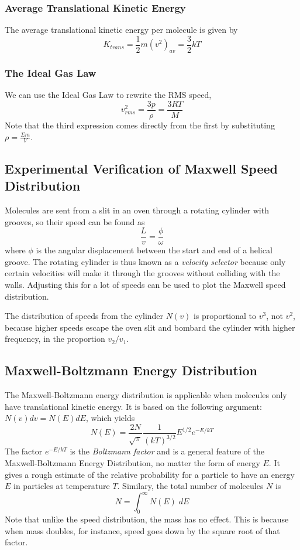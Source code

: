 \documentclass[../PhysicsFormulae.tex]{subfiles}
\begin{document}
\subsubsection{Average Translational Kinetic Energy}
The average translational kinetic energy per molecule is given by 
\[ {K}_{trans} = \frac{1}{2}m(v^2)_{av} = \frac{3}{2}kT \]

\subsubsection{The Ideal Gas Law}
We can use the Ideal Gas Law to rewrite the RMS speed, 
\[ v_{rms}^2 = \frac{3p}{\rho} = \frac{3RT}{M} \]
Note that the third expression comes directly from the first by substituting $\rho = \frac{\Sigma m}{V}$. 

\subsection{Experimental Verification of Maxwell Speed Distribution}
Molecules are sent from a slit in an oven through a rotating cylinder with grooves, so their speed can be found as 
\[ \frac{L}{v} = \frac{\phi}{\omega} \]
where $\phi$ is the angular displacement between the start and end of a helical groove. The rotating cylinder is thus known as a \textit{velocity selector} because only certain velocities will make it through the grooves without colliding with the walls. Adjusting this for a lot of speeds can be used to plot the Maxwell speed distribution. \bigskip

The distribution of speeds from the cylinder $N(v)$ is proportional to $v^3$, not $v^2$, because higher speeds escape the oven slit and bombard the cylinder with higher frequency, in the proportion $v_2 / v_1$. 

\subsection{Maxwell-Boltzmann Energy Distribution}
The Maxwell-Boltzmann energy distribution is applicable when molecules only have translational kinetic energy. It is based on the following argument: $N(v)dv = N(E)dE$, which yields
\[ N(E) = \frac{2N}{\sqrt{\pi}} \frac{1}{(kT)^{3/2}} E^{1/2} e^{-E/kT} \]
The factor $e^{-E/kT}$ is the \textit{Boltzmann factor} and is a general feature of the Maxwell-Boltzmann Energy Distribution, no matter the form of energy $E$. It gives a rough estimate of the relative probability for a particle to have an energy $E$ in particles at temperature $T$. \bigskip
Similary, the total number of molecules $N$ is 
\[ N = \int_0^{\infty} N(E) \; dE \]
Note that unlike the speed distribution, the mass has no effect. This is because when mass doubles, for instance, speed goes down by the square root of that factor. 
\end{document}
